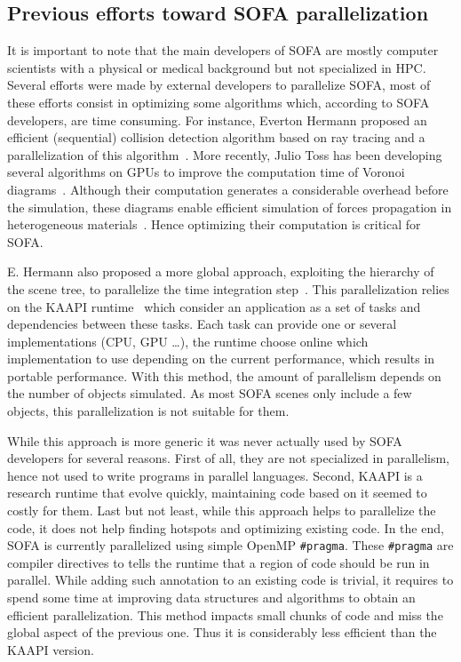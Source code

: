 \subsection{Previous efforts toward SOFA parallelization}

It is important to note that the main developers of \gls{SOFA} are  mostly computer scientists with a physical or medical background but not specialized in \gls{HPC}.
Several efforts were made by external developers to parallelize \gls{SOFA}, most of these efforts consist in optimizing some algorithms which, according to \gls{SOFA} developers, are time consuming.
For instance, Everton Hermann proposed an efficient (sequential) collision detection algorithm based on ray tracing and a parallelization of this algorithm~\cite{Hermann08Raytraced}.
More recently, Julio Toss has been developing several algorithms on \glspl{GPU} to improve the computation time of Voronoi diagrams~\cite{Toss13Parallel,Toss14Parallel}.
Although their computation generates a considerable overhead before the simulation, these diagrams enable efficient simulation of forces propagation in heterogeneous materials~\cite{Faure11Sparse}.
Hence optimizing their computation is critical for \gls{SOFA}.

E. Hermann also proposed a more global approach, exploiting the hierarchy of the scene tree, to parallelize the time integration step~\cite{Hermann09Interactive}.
This parallelization relies on the \gls{KAAPI} runtime~\cite{Gautier07KAAPI} which consider an application as a set of tasks and dependencies between these tasks.
Each task can provide one or several implementations (\gls{CPU}, \gls{GPU} \ldots), the runtime choose online which implementation to use depending on the current performance, which results in portable performance.
With this method, the amount of parallelism depends on the number of objects simulated.
As  most \gls{SOFA} scenes only include a few objects, this parallelization is not suitable for them.

While this approach is more generic it was never actually used by \gls{SOFA} developers for several reasons.
First of all, they are not specialized in parallelism, hence not used to write programs in parallel languages.
Second, \gls{KAAPI} is a research runtime that evolve quickly, maintaining code based on it seemed to costly for them.
Last but not least, while this approach helps to parallelize the code, it does not help finding hotspots and optimizing existing code.
In the end, \gls{SOFA} is currently parallelized using simple \gls{OpenMP} \texttt{\#pragma}.
These  \texttt{\#pragma} are compiler directives to tells the runtime that a region of code should be run in parallel.
While adding such annotation to an existing code is trivial, it requires to spend some time at improving data structures and algorithms to obtain an efficient parallelization.
This method impacts small chunks of code and miss the global aspect of the previous one.
Thus it is considerably less efficient than the \gls{KAAPI} version.

